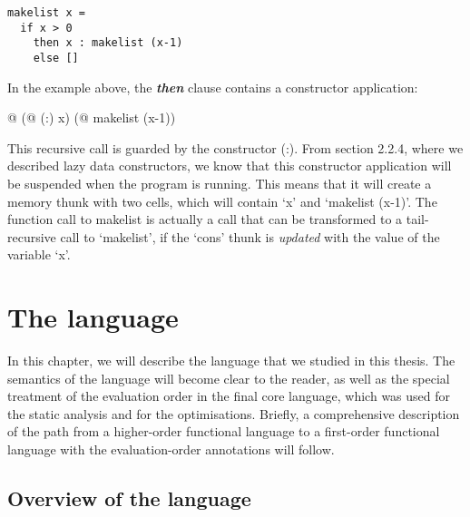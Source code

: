 \documentclass[diploma]{softlab-thesis}
\begin{document}
\begin{verbatim}
makelist x = 
  if x > 0 
    then x : makelist (x-1)
    else []
\end{verbatim}

In the example above, the \textbf{\textit{then}} clause contains a constructor 
application: 
\begin{center}
  @ (@ (:) x) (@ makelist (x-1))
\end{center}

This recursive call is guarded by the constructor (:).
From section 2.2.4, where we described lazy data constructors,
we know that this constructor application will be suspended when 
the program is running. This means that it will create a memory 
thunk with two cells, which will contain `x' and `makelist (x-1)'.
The function call to makelist is actually a call that can be transformed 
to a tail-recursive call to `makelist', if the `cons' thunk is \textit{updated} 
with the value of the variable `x'. 





\chapter {The language} 
In this chapter, we will describe the language that we studied in this thesis.
The semantics of the language will become clear to the reader, as well as 
the special treatment of the evaluation order in the final core 
language, which was used for the static analysis and for the optimisations. Briefly, a 
comprehensive description of the path from a higher-order functional language 
to a first-order functional language with the evaluation-order annotations will follow.

\section {Overview of the language }
\end{document}
